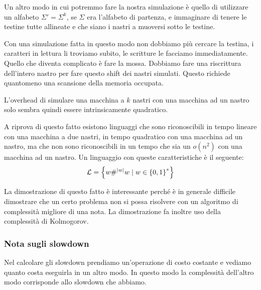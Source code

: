 Un altro modo in cui potremmo fare la nostra simulazione è quello di utilizzare un alfabeto
$\Sigma' = \Sigma^{k}$, se $\Sigma$ era l'alfabeto di partenza, e immaginare di tenere le testine
tutte allineate e che siano i nastri a muoversi sotto le testine.

Con una simulazione fatta in questo modo non dobbiamo più cercare la testina, i caratteri in
lettura li troviamo subito, le scritture le facciamo immediatamente. Quello che diventa complicato
è fare la mossa. Dobbiamo fare una riscrittura dell'intero nastro per fare questo shift dei nastri
simulati. Questo richiede quantomeno una scansione della memoria occupata.

%

L'overhead di simulare una macchina a $k$ nastri con una macchina ad un nastro solo sembra quindi
essere intrinsicamente quadratico.



A riprova di questo fatto esistono linguaggi che sono riconoscibili in tempo lineare con una
macchina a due nastri, in tempo quadratico con una macchina ad un nastro, ma che non sono
riconoscibili in un tempo che sia un $o(n^{2})$ con una macchina ad un nastro. Un linguaggio con
queste caratteristiche è il seguente:
\begin{equation*}
    \mathcal{L} = \left\{w\#^{|w|}w \mid w \in \left\{0,1\right\}^{*}\right\}
\end{equation*}

La dimostrazione di questo fatto è interessante perché è in generale difficile dimostrare che un
certo problema non si possa risolvere con un algoritmo di complessità migliore di una nota. La
dimostrazione fa inoltre uso della complessità di Kolmogorov.

\subsubsection{Nota sugli slowdown}

Nel calcolare gli slowdown prendiamo un'operazione di costo costante e vediamo quanto costa
eseguirla in un altro modo. In questo modo la complessità dell'altro modo corrisponde allo slowdown
che abbiamo.

